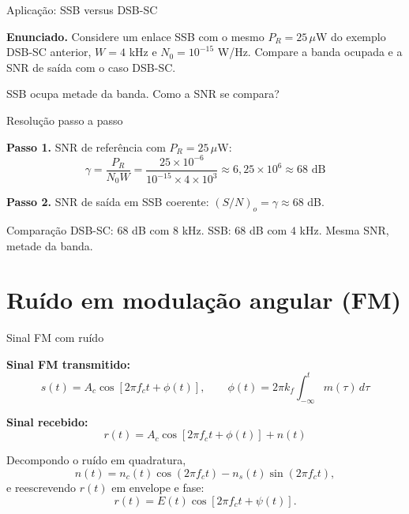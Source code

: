 
\begin{frame}{Aplicação: SSB versus DSB-SC}

\textbf{Enunciado.} Considere um enlace SSB com o mesmo $P_R = 25\,\mu$W do exemplo DSB-SC anterior, $W = 4$ kHz e $N_0 = 10^{-15}$ W/Hz. Compare a banda ocupada e a SNR de saída com o caso DSB-SC.

\begin{center}
\end{center}

SSB ocupa metade da banda. Como a SNR se compara?

\end{frame}


\begin{frame}{Resolução passo a passo}

\textbf{Passo 1.} SNR de referência com $P_R = 25\,\mu$W:
\[
\gamma = \frac{P_R}{N_0 W} = \frac{25 \times 10^{-6}}{10^{-15} \times 4 \times 10^{3}} \approx 6{,}25 \times 10^{6} \approx 68 \text{ dB}
\]

\textbf{Passo 2.} SNR de saída em SSB coerente: $(S/N)_o = \gamma \approx 68$ dB.

\begin{block}{Comparação}
DSB-SC: $68$ dB com $8$ kHz. SSB: $68$ dB com $4$ kHz. Mesma SNR, metade da banda.
\end{block}

\end{frame}


\section{Ruído em modulação angular (FM)}

\begin{frame}{Sinal FM com ruído}

\textbf{Sinal FM transmitido:}
\[
s(t) = A_c \cos\!\left[2\pi f_c t + \phi(t)\right], \qquad \phi(t) = 2\pi k_f \int_{-\infty}^{t} m(\tau)\, d\tau
\]

\textbf{Sinal recebido:}
\[
r(t) = A_c \cos[2\pi f_c t + \phi(t)] + n(t)
\]

Decompondo o ruído em quadratura,
\[
n(t) = n_c(t)\cos(2\pi f_c t) - n_s(t)\sin(2\pi f_c t),
\]
e reescrevendo $r(t)$ em envelope e fase:
\[
r(t) = E(t)\cos\!\left[2\pi f_c t + \psi(t)\right].
\]

\end{frame}

